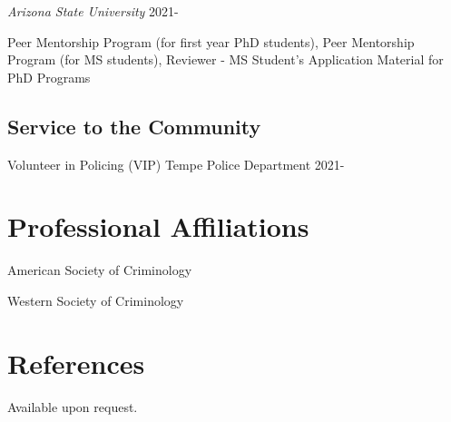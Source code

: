 \documentclass[11pt,]{article}
\begin{document}
\emph{Arizona State University} \hfill 2021-

Peer Mentorship Program (for first year PhD students), Peer Mentorship
Program (for MS students), Reviewer - MS Student's Application Material
for PhD Programs

\hypertarget{service-to-the-community}{%
\subsection{Service to the Community}\label{service-to-the-community}}

Volunteer in Policing (VIP) Tempe Police Department \hfill 2021-

\vspace{2mm}

\hypertarget{professional-affiliations}{%
\section{Professional Affiliations}\label{professional-affiliations}}

American Society of Criminology

Western Society of Criminology

\vspace{2mm}

\hypertarget{references}{%
\section{References}\label{references}}

Available upon request.
\end{document}
